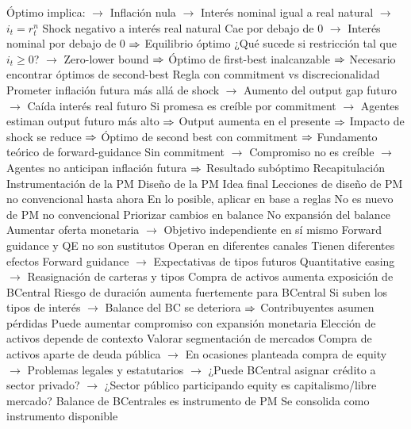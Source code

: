 \documentclass{nuevotema}
\begin{document}
\begin{esquemal}
				\4 Óptimo implica:
				\4[] $\to$ Inflación nula
				\4[] $\to$ Interés nominal igual a real natural $\to$ $i_t = r_t^n$
				\4 Shock negativo a interés real natural
				\4[] Cae por debajo de 0
				\4[] $\to$ Interés nominal por debajo de 0
				\4[] $\Rightarrow$ Equilibrio óptimo
				\4[] ¿Qué sucede si restricción tal que $i_t \geq 0$?
				\4[] $\to$ Zero-lower bound
				\4[] $\Rightarrow$ Óptimo de first-best inalcanzable
				\4[] $\Rightarrow$ Necesario encontrar óptimos de second-best
				\4 Regla con commitment vs discrecionalidad
				\4[] Prometer inflación futura más allá de shock
				\4[] $\to$ Aumento del output gap futuro
				\4[] $\to$ Caída interés real futuro
				\4[] Si promesa es creíble por commitment
				\4[] $\to$ Agentes estiman output futuro más alto
				\4[] $\Rightarrow$ Output aumenta en el presente
				\4[] $\Rightarrow$ Impacto de shock se reduce
				\4[] $\Rightarrow$ Óptimo de second best con commitment
				\4[] $\Rightarrow$ Fundamento teórico de forward-guidance
				\4[] Sin commitment
				\4[] $\to$ Compromiso no es creíble
				\4[] $\to$ Agentes no anticipan inflación futura
				\4[] $\Rightarrow$ Resultado subóptimo
	\1[] 
		\2 Recapitulación
			\3 Instrumentación de la PM
			\3 Diseño de la PM
		\2 Idea final
			\3 Lecciones de diseño de PM no convencional hasta ahora
				\4[I] En lo posible, aplicar en base a reglas
				\4[] No es nuevo de PM no convencional
				\4[II] Priorizar cambios en balance
				\4[] No expansión del balance
				\4[] Aumentar oferta monetaria
				\4[] $\to$ Objetivo independiente en sí mismo
				\4[III] Forward guidance y QE no son sustitutos
				\4[] Operan en diferentes canales
				\4[] Tienen diferentes efectos
				\4[] Forward guidance
				\4[] $\to$ Expectativas de tipos futuros
				\4[] Quantitative easing
				\4[] $\to$ Reasignación de carteras y tipos
				\4[IV] Compra de activos aumenta exposición de BCentral
				\4[] Riesgo de duración aumenta fuertemente para BCentral
				\4[] Si suben los tipos de interés
				\4[] $\to$ Balance del BC se deteriora
				\4[] $\Rightarrow$ Contribuyentes asumen pérdidas
				\4[] Puede aumentar compromiso con expansión monetaria
				\4[V] Elección de activos depende de contexto
				\4[] Valorar segmentación de mercados
				\4[] Compra de activos aparte de deuda pública
				\4[] $\to$ En ocasiones planteada compra de equity
				\4[] $\to$ Problemas legales y estatutarios
				\4[] $\to$ ¿Puede BCentral asignar crédito a sector privado?
				\4[] $\to$ ¿Sector público participando equity es capitalismo/libre mercado?
				\4[VI] Balance de BCentrales es instrumento de PM
				\4[] Se consolida como instrumento disponible

\end{esquemal}
\end{document}

